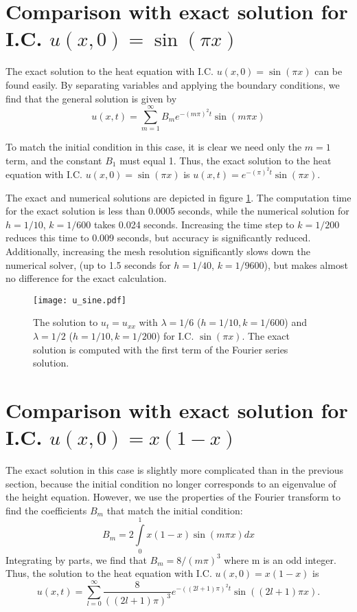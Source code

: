 \documentclass[11pt]{amsart}
\begin{document}
\section{Comparison with exact solution for  I.C. $u(x,0)= \sin(\pi x)$} 

The exact solution to the heat equation with  I.C. $u(x,0)= \sin(\pi x)$ can be found easily. By separating variables and applying the boundary conditions, we find that the general solution is given by 
\begin{equation}
u(x,t) =   \sum\limits_{m = 1}^{\infty} B_m e^{-(m \pi)^2 t} \sin (m \pi x)   
\end{equation}\label{gensol}  

To match the initial condition in this case, it is clear we need only  the $m=1$ term, and the constant $B_1$ must equal 1. Thus, the exact solution to the heat equation with I.C. $u(x,0)= \sin(\pi x)$ is $u(x,t) =  e^{-(\pi)^2 t} \sin (\pi x)$.  

The exact and numerical solutions are depicted in figure \ref{usine}.  The computation time for the exact solution is less than 0.0005 seconds, while the numerical solution for $h=1/10$, $k=1/600$ takes 0.024 seconds. Increasing the time step to $k=1/200$ reduces this time to 0.009 seconds, but accuracy is significantly reduced. Additionally, increasing the mesh resolution significantly slows down the numerical solver, (up to 1.5 seconds for $h=1/40$, $k=1/9600$), but makes almost no difference for the exact calculation. 

\begin{figure}[t]
\begin{center} 
\texttt{[image: u\_sine.pdf]}
\caption{The solution to $u_t = u_{xx}$ with  $\lambda =1/6$ ($h=1/10 , k = 1/600$) and  $\lambda =1/2$ ($h=1/10 , k = 1/200$)   for I.C. $\sin(\pi x)$. The exact solution is computed with the first  term of the Fourier series solution. }
\label{usine} 
\end{center}
\end{figure}

\section{Comparison with exact solution for  I.C. $u(x,0)= x(1-x)$} 

The exact solution in this case is slightly more complicated than in the previous section, because the initial condition no longer corresponds to an eigenvalue of the height equation. However,  we use the properties of the Fourier transform to find the coefficients $B_m$ that match the initial condition: 
\begin{equation} 
B_m = 2 \int\limits_0^1  x(1-x) \sin(m \pi x) dx 
\end{equation} 
Integrating by parts, we find that $B_m = 8/(m \pi)^3$ where m is an odd integer.  
Thus, the solution to the heat equation with I.C. $u(x,0)= x(1-x)$ is
\begin{equation} 
 u(x,t) = \sum\limits_{l=0}^{\infty} \frac{8}{((2l+1)\pi)^3} e^{-((2l+1)\pi)^2 t} \sin ((2l+1)\pi x).
 \end{equation} 
 
\end{document}
